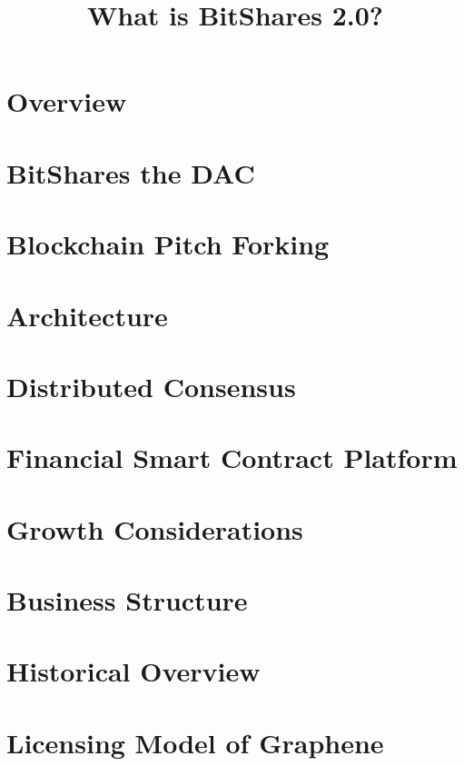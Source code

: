 \documentclass[conference,final,10pt,a4paper]{IEEEtran}
\title{What is BitShares 2.0?}
\begin{document}
\sloppy
\maketitle

\begin{abstract}
\end{abstract}
\section  { Overview                          } 
\section  { BitShares the DAC                 } 
\section  { Blockchain Pitch Forking          } 
\section  { Architecture                      } 
\section  { Distributed Consensus             } 
\section  { Financial Smart Contract Platform } 
\section  { Growth Considerations             } 
\section  { Business Structure                } 
\section  { Historical Overview               } 
\section  { Licensing Model of Graphene       } 


\end{document}
